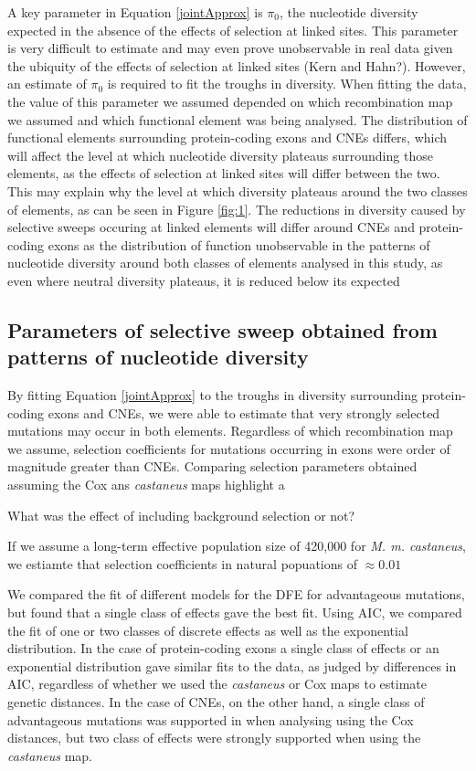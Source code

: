 \documentclass[11pt]{article}
\begin{document}
	A key parameter in Equation \ref{jointApprox} is $\pi_0$, the nucleotide diversity expected in the absence of the effects of selection at linked sites. This parameter is very difficult to estimate and may even prove unobservable in real data given the ubiquity of the effects of selection at linked sites (Kern and Hahn?). However, an estimate of $\pi_0$ is required to fit the troughs in diversity. When fitting the data, the value of this parameter we assumed depended on which recombination map we assumed and which functional element was being analysed. The distribution of functional elements surrounding protein-coding exons and CNEs differs, which will affect the level at which nucleotide diversity plateaus surrounding those elements, as the effects of selection at linked sites will differ between the two. This may explain why the level at which diversity plateaus around the two classes of elements, as can be seen in Figure \ref{fig:1}.
	The reductions in diversity caused by selective sweeps occuring at linked elements will differ around CNEs and protein-coding exons as the distribution of function
	unobservable in the patterns of nucleotide diversity around both classes of elements analysed in this study, as even where neutral diversity plateaus, it is reduced below its expected 

\subsection*{Parameters of selective sweep obtained from patterns of nucleotide diversity}

	By fitting Equation \ref{jointApprox} to the troughs in diversity surrounding protein-coding exons and CNEs, we were able to estimate that very strongly selected mutations may occur in both elements. Regardless of which recombination map we assume, selection coefficients for mutations occurring in exons were order of magnitude greater than CNEs. Comparing selection parameters obtained assuming the Cox ans \textit{castaneus} maps highlight a 

	What was the effect of including background selection or not?
	
	If we assume a long-term effective population size of 420,000 for \textit{M. m. castaneus}, we estiamte that selection coefficients in natural popuations of $\approx 0.01$


	We compared the fit of different models for the DFE for advantageous mutations, but found that a single class of effects gave the best fit. Using AIC, we compared the fit of one or two classes of discrete effects as well as the exponential distribution. In the case of protein-coding exons a single class of effects or an exponential distribution gave similar fits to the data, as judged by differences in AIC, regardless of whether we used the \textit{castaneus} or Cox maps to estimate genetic distances. In the case of CNEs, on the other hand, a single class of advantageous mutations was supported in when analysing using the Cox distances, but two class of effects were strongly supported when using the \textit{castaneus} map. 
\end{document}
